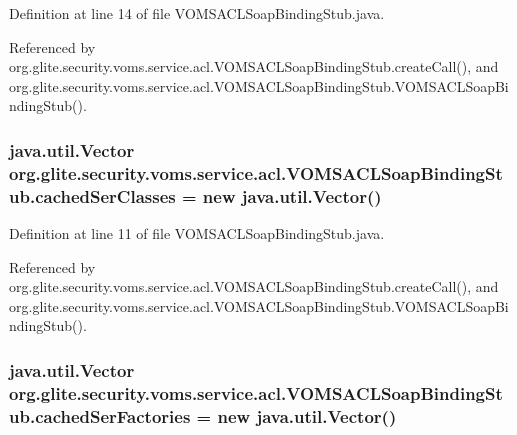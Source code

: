 Definition at line 14 of file VOMSACLSoapBindingStub.java.



Referenced by org.glite.security.voms.service.acl.VOMSACLSoapBindingStub.createCall(), and org.glite.security.voms.service.acl.VOMSACLSoapBindingStub.VOMSACLSoapBindingStub().

\hypertarget{classorg_1_1glite_1_1security_1_1voms_1_1service_1_1acl_1_1VOMSACLSoapBindingStub_a82236f77a34615d37767ccf05dd107e3}{
\subsubsection[{cachedSerClasses}]{\setlength{\rightskip}{0pt plus 5cm}java.util.Vector {\bf org.glite.security.voms.service.acl.VOMSACLSoapBindingStub.cachedSerClasses} = new java.util.Vector()}}
\label{classorg_1_1glite_1_1security_1_1voms_1_1service_1_1acl_1_1VOMSACLSoapBindingStub_a82236f77a34615d37767ccf05dd107e3}


Definition at line 11 of file VOMSACLSoapBindingStub.java.



Referenced by org.glite.security.voms.service.acl.VOMSACLSoapBindingStub.createCall(), and org.glite.security.voms.service.acl.VOMSACLSoapBindingStub.VOMSACLSoapBindingStub().

\hypertarget{classorg_1_1glite_1_1security_1_1voms_1_1service_1_1acl_1_1VOMSACLSoapBindingStub_aa514a226d14f7fdd2a0f98672de1d023}{
\subsubsection[{cachedSerFactories}]{\setlength{\rightskip}{0pt plus 5cm}java.util.Vector {\bf org.glite.security.voms.service.acl.VOMSACLSoapBindingStub.cachedSerFactories} = new java.util.Vector()}}
\label{classorg_1_1glite_1_1security_1_1voms_1_1service_1_1acl_1_1VOMSACLSoapBindingStub_aa514a226d14f7fdd2a0f98672de1d023}


